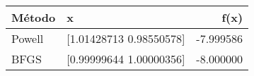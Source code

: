 \begin{tabular}{llr}
\toprule
Método & x & f(x) \\
\midrule
Powell & [1.01428713 0.98550578] & -7.999586 \\
BFGS & [0.99999644 1.00000356] & -8.000000 \\
\bottomrule
\end{tabular}
